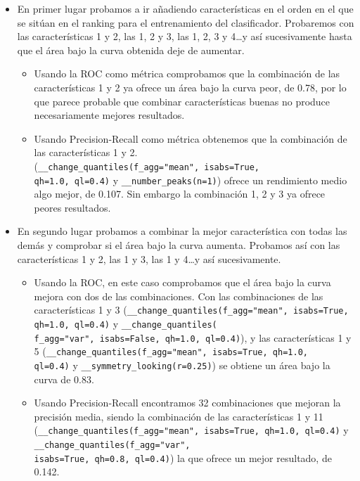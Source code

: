 \documentclass[a4paper,12pt,twoside,oldfontcommands]{memoir}
\begin{document}
\begin{itemize}
    \item En primer lugar probamos a ir añadiendo características en el orden en el que se sitúan en el ranking para el entrenamiento del clasificador. Probaremos con las características 1 y 2, las 1, 2 y 3, las 1, 2, 3 y 4\dots y así sucesivamente hasta que el área bajo la curva obtenida deje de aumentar. 
    \begin{itemize}
        \item Usando la ROC como métrica comprobamos que la combinación de las características 1 y 2 ya ofrece un área bajo la curva peor, de 0.78, por lo que parece probable que combinar características buenas no produce necesariamente mejores resultados.
        \item Usando Precision-Recall como métrica obtenemos que la combinación de las características 1 y 2.
        \\(\texttt{\_\_change\_quantiles(f\_agg="mean", isabs=True,\\ qh=1.0, ql=0.4)} y \texttt{\_\_number\_peaks(n=1)}) ofrece un rendimiento medio algo mejor, de 0.107. Sin embargo la combinación 1, 2 y 3 ya ofrece peores resultados.
    \end{itemize} 
    \item En segundo lugar probamos a combinar la mejor característica con todas las demás y comprobar si el área bajo la curva aumenta. Probamos así con las características 1 y 2, las 1 y 3, las 1 y 4\dots y así sucesivamente. 
    \begin{itemize}
        \item Usando la ROC, en este caso comprobamos que el área bajo la curva mejora con dos de las combinaciones. Con las combinaciones de las características 1 y 3 (\texttt{\_\_change\_quantiles(f\_agg="mean", isabs=True, qh=1.0, ql=0.4)} y \texttt{\_\_change\_quantiles(\\f\_agg="var", isabs=False, qh=1.0, ql=0.4)}), y las características 1 y 5 (\texttt{\_\_change\_quantiles(f\_agg="mean", isabs=True, qh=1.0,\\ ql=0.4)} y \texttt{\_\_symmetry\_looking(r=0.25)}) se obtiene un área bajo la curva de 0.83. 
        \item Usando Precision-Recall encontramos 32 combinaciones que mejoran la precisión media, siendo la combinación de las características 1 y 11 (\texttt{\_\_change\_quantiles(f\_agg="mean", isabs=True, qh=1.0, ql=0.4)} y \texttt{\_\_change\_quantiles(f\_agg="var",\\ isabs=True, qh=0.8, ql=0.4)}) la que ofrece un mejor resultado, de 0.142. 
    \end{itemize}
\end{itemize}
\end{document}
